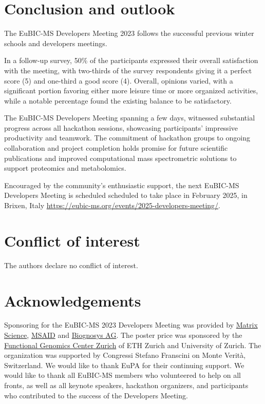 \section{Conclusion and outlook}
The EuBIC-MS Developers Meeting 2023 follows the successful previous winter schools and developers meetings.

In a follow-up survey, 50\% of the participants expressed their overall satisfaction with the meeting, with two-thirds of the survey respondents giving it a perfect score (5) and one-third a good score (4).
Overall, opinions varied, with a significant portion favoring either more leisure time or more organized activities, while a notable percentage found the existing balance to be satisfactory.
    
The EuBIC-MS Developers Meeting spanning a few days, witnessed substantial progress across all hackathon sessions, showcasing participants' impressive productivity and teamwork. The commitment of hackathon groups to ongoing collaboration and project completion holds promise for future scientific publications and improved computational mass spectrometric solutions to support proteomics and metabolomics.

Encouraged by the community’s enthusiastic support, the next EuBIC-MS Developers Meeting is scheduled scheduled to take place in February 2025, in Brixen, Italy \url{https://eubic-ms.org/events/2025-developers-meeting/}.
 
\section{Conflict of interest}
The authors declare no conflict of interest.
 
\section{Acknowledgements}
Sponsoring for the EuBIC-MS 2023 Developers Meeting was provided by \href{https://www.matrixscience.com/}{Matrix Science}, \href{https://www.msaid.de/}{MSAID} and \href{https://biognosys.com/}{Biognosys AG}. The poster price was sponsored by the \href{https://fgcz.ch}{Functional Genomics Center Zurich} of ETH Zurich and University of Zurich. The organization was supported by Congressi Stefano Franscini on Monte Verità, Switzerland. We would like to thank EuPA for their continuing support. We would like to thank all EuBIC-MS members who volunteered to help on all fronts, as well as all keynote speakers, hackathon organizers, and participants who contributed to the success of the Developers Meeting.

